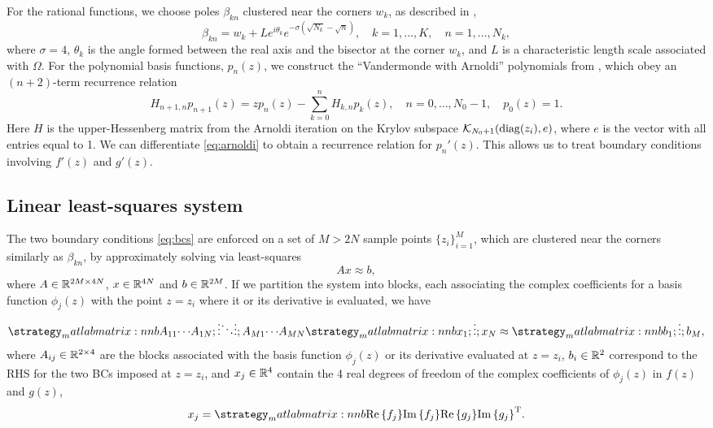 For the rational functions, we choose poles $\beta_{kn}$ clustered near the corners $w_k$, as described in \cite{gopal19},
\begin{equation}
\beta_{kn} = w_k + Le^{i\theta_k} e^{-\sigma (\sqrt{N_k}-\sqrt{n})}, \quad k=1,\ldots,K,\quad n=1,\ldots,N_k,
\end{equation}
where $\sigma=4$, $\theta_k$ is the angle formed between the real axis and the bisector at the corner $w_k$, and $L$ is a characteristic length scale associated with $\Omega$. For the polynomial basis functions, $p_n(z)$, we construct the ``Vandermonde with Arnoldi'' polynomials from \cite{brubeck19}, which obey an $(n+2)$-term recurrence relation
\begin{equation} \label{eq:arnoldi}
H_{n+1,n} p_{n+1}(z) = z p_n(z) - \sum_{k=0}^n H_{k,n} p_k(z),\quad n=0,\ldots,N_0-1, \quad p_0(z)=1.
\end{equation}
Here $H$ is the upper-Hessenberg matrix from the Arnoldi iteration on the Krylov subspace $\mathcal{K}_{N_0+1}(\operatorname{diag}(z_i), e)$, where $e$ is the vector with all entries equal to 1. We can differentiate \eqref{eq:arnoldi} to obtain a recurrence relation for $p_n'(z)$. This allows us to treat boundary conditions involving $f'(z)$ and $g'(z)$.



\subsection{Linear least-squares system}
The two boundary conditions \eqref{eq:bcs} are enforced on a set of $M > 2N$ sample points $\{z_i \}_{i=1}^M$, which
are clustered near the corners similarly as $\beta_{kn}$, by approximately solving via least-squares
\begin{equation} \label{eq:LS}
A x\approx b,
\end{equation}
where $A\in\mathbb{R}^{2M\times 4N}$, $x\in\mathbb{R}^{4N}$ and $b\in\mathbb{R}^{2M}$. If we partition the system into blocks, each associating the complex coefficients for a basis function $\phi_j(z)$ with the point $z=z_i$ where it or its derivative is evaluated, we have
\begin{equation}
\matlabmatrix{A_{11} {\cdots} A_{1N}; {\vdots} {\ddots} {\vdots}; A_{M1} {\cdots} A_{MN}}
\matlabmatrix{x_{1}; {\vdots}; x_{N}} \approx \matlabmatrix{b_{1}; {\vdots}; b_{M}},
\end{equation}
where $A_{ij}\in\mathbb{R}^{2\times 4}$ are the blocks associated with the basis function $\phi_{j}(z)$ or its derivative evaluated at $z=z_i$, $b_i\in\mathbb{R}^2$ correspond to the RHS for the two BCs imposed at $z=z_i$, and $x_j\in\mathbb{R}^4$ contain the 4 real degrees of freedom of the complex coefficients of $\phi_j(z)$ in $f(z)$ and $g(z)$,
\begin{equation}
x_ j = \matlabmatrix{\real{f_j} \imag{f_j} \real{g_j} \imag{g_j}}^\transp.
\end{equation}


